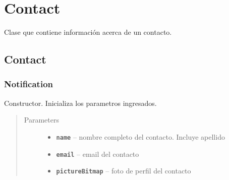 \documentclass[letterpaper,10pt,english]{sphinxmanual}
\begin{document}
\section{Contact}
\label{Model/Contact:contact}\label{Model/Contact::doc}

\begin{fulllineitems}
\label{Model/Contact:com.fiuba.tallerii.jobify.Contact}
Clase que contiene información acerca de un contacto.

\end{fulllineitems}



\subsection{Contact}
\label{Model/Contact:id1}

\subsubsection{Notification}
\label{Model/Contact:notification}

\begin{fulllineitems}
\label{Model/Contact:com.fiuba.tallerii.jobify.Contact.Contact(String, String, Bitmap)}
Constructor. Inicializa los parametros ingresados.
\begin{quote}\begin{description}
\item[{Parameters}] \leavevmode\begin{itemize}
\item {} 
\textbf{\texttt{name}} -- nombre completo del contacto. Incluye apellido

\item {} 
\textbf{\texttt{email}} -- email del contacto

\item {} 
\textbf{\texttt{pictureBitmap}} -- foto de perfil del contacto

\end{itemize}

\end{description}\end{quote}

\end{fulllineitems}
\end{document}
